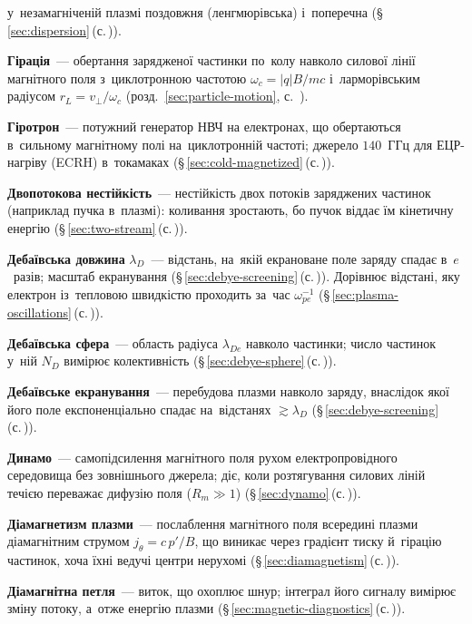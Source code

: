 	  у~незамагніченій плазмі поздовжня (ленгмюрівська) і~поперечна (§\,\ref{sec:dispersion}\,(с.\,\pageref{sec:dispersion})).
	\item \textbf{Гірація}~--- обертання зарядженої частинки по~колу навколо силової лінії магнітного поля з~циклотронною частотою $\omega_c=|q|B/mc$ і~ларморівським радіусом $r_L=v_\perp/\omega_c$ (розд.~\ref{sec:particle-motion}, с.~\pageref{sec:particle-motion}).
	\item \textbf{Гіротрон}~--- потужний генератор НВЧ на електронах, що обертаються в~сильному магнітному полі на~циклотронній частоті;
	  джерело $140$~ГГц для ЕЦР-нагріву (ECRH) в~токамаках (§\,\ref{sec:cold-magnetized}\,(с.\,\pageref{sec:cold-magnetized})).
	\item \textbf{Двопотокова нестійкість}~--- нестійкість двох потоків заряджених частинок (наприклад пучка в~плазмі): коливання зростають, бо пучок віддає їм кінетичну енергію (§\,\ref{sec:two-stream}\,(с.\,\pageref{sec:two-stream})).
	\item \textbf{Дебаївська довжина} $\lambda_D$~--- відстань, на~якій екрановане поле заряду спадає в~$e$~разів;
	  масштаб екранування (§\,\ref{sec:debye-screening}\,(с.\,\pageref{sec:debye-screening})). Дорівнює відстані, яку електрон із~тепловою швидкістю
	  проходить за~час $\omega_{pe}^{-1}$ (§\,\ref{sec:plasma-oscillations}\,(с.\,\pageref{sec:plasma-oscillations})).
	\item \textbf{Дебаївська сфера}~--- область радіуса $\lambda_{De}$ навколо частинки; число частинок у~ній
	  $N_D$ вимірює колективність (§\,\ref{sec:debye-sphere}\,(с.\,\pageref{sec:debye-sphere})).
	\item \textbf{Дебаївське екранування}~--- перебудова плазми навколо заряду, внаслідок якої його поле
	  експоненціально спадає на~відстанях $\gtrsim\lambda_D$ (§\,\ref{sec:debye-screening}\,(с.\,\pageref{sec:debye-screening})).
	\item \textbf{Динамо}~--- самопідсилення магнітного поля рухом електропровідного середовища без зовнішнього джерела; діє, коли
	  розтягування силових ліній течією переважає дифузію поля ($R_m\gg1$) (§\,\ref{sec:dynamo}\,(с.\,\pageref{sec:dynamo})).
	\item \textbf{Діамагнетизм плазми}~--- послаблення магнітного поля всередині плазми діамагнітним струмом $j_\theta=c\,p'/B$, що виникає через градієнт тиску й~гірацію частинок, хоча їхні ведучі центри нерухомі (§\,\ref{sec:diamagnetism}\,(с.\,\pageref{sec:diamagnetism})).
	\item \textbf{Діамагнітна петля}~--- виток, що охоплює шнур; інтеграл його сигналу вимірює зміну потоку, а~отже енергію плазми (§\,\ref{sec:magnetic-diagnostics}\,(с.\,\pageref{sec:magnetic-diagnostics})).
